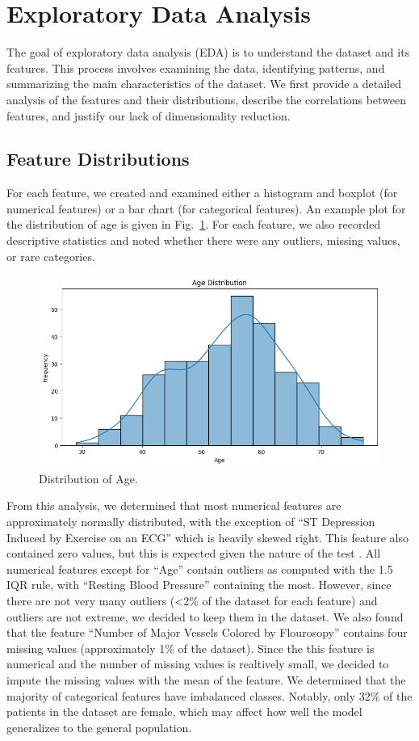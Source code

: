 \section{Exploratory Data Analysis}

The goal of exploratory data analysis (EDA) is to understand the dataset and its features. This process involves examining the data, identifying patterns, and summarizing the main characteristics of the dataset. We first provide a detailed analysis of the features and their distributions, describe the correlations between features, and justify our lack of dimensionality reduction.

\subsection{Feature Distributions}
For each feature, we created and examined either a histogram and boxplot (for numerical features) or a bar chart (for categorical features). An example plot for the distribution of age is given in Fig.~\ref{agedist}. For each feature, we also recorded descriptive statistics and noted whether there were any outliers, missing values, or rare categories.

\begin{figure}[htbp]
    \centerline{\includegraphics[width=0.8\columnwidth]{img/agedist.png}}
    \caption{Distribution of Age.}\label{agedist}
\end{figure}

From this analysis, we determined that most numerical features are approximately normally distributed, with the exception of ``ST Depression Induced by Exercise on an ECG'' which is heavily skewed right. This feature also contained zero values, but this is expected given the nature of the test \cite{katheria2021stdepression}. All numerical features except for ``Age'' contain outliers as computed with the 1.5 IQR rule, with ``Resting Blood Pressure'' containing the most. However, since there are not very many outliers (<2\% of the dataset for each feature) and outliers are not extreme, we decided to keep them in the dataset. We also found that the feature ``Number of Major Vessels Colored by Flourosopy'' contains four missing values (approximately 1\% of the dataset). Since the this feature is numerical and the number of missing values is realtively small, we decided to impute the missing values with the mean of the feature.
We determined that the majority of categorical features have imbalanced classes. Notably, only 32\% of the patients in the dataset are female, which may affect how well the model generalizes to the general population.

